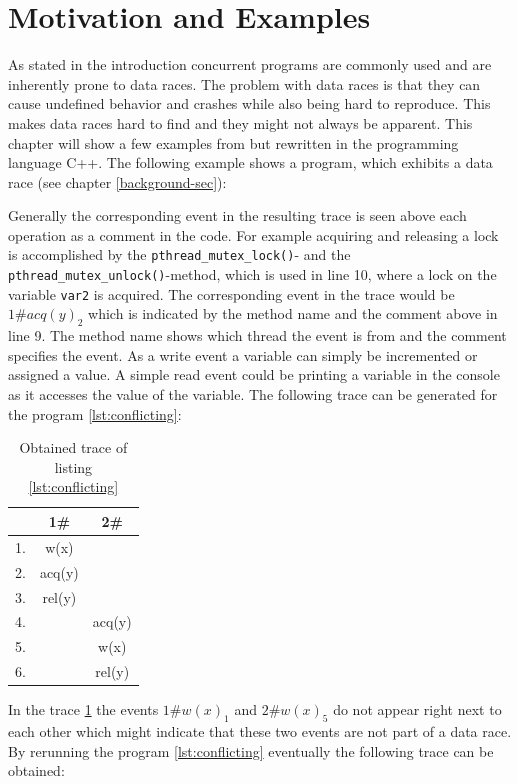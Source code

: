 \documentclass[12pt]{article}
\begin{document}
	\section{Motivation and Examples}
	As stated in the introduction concurrent programs are commonly used and are inherently prone to data races. The problem with data races is that they can cause undefined behavior and crashes while also being hard to reproduce. This makes data races hard to find and they might not always be apparent. This chapter will show a few examples from \cite{sulzmann2} but rewritten in the programming language C++. The following example shows a program, which exhibits a data race (see chapter \ref{background-sec}):
	
	Generally the corresponding event in the resulting trace is seen above each operation as a comment in the code. For example acquiring and releasing a lock is accomplished by the \texttt{pthread\_mutex\_lock()}- and the \texttt{pthread\_mutex\_unlock()}-method, which is used in line 10, where a lock on the variable \texttt{var2} is acquired. The corresponding event in the trace would be $1\#acq(y)_2$ which is indicated by the method name and the comment above in line 9. The method name shows which thread the event is from and the comment specifies the event. As a write event a variable can simply be incremented or assigned a value. A simple read event could be printing a variable in the console as it accesses the value of the variable. The following trace can be generated for the program \ref{lst:conflicting}:
	\begin{table}[H]
		\begin{center}
			\begin{tabular}{ c c c}
				& 1\# & 2\# \\
				\hline
				1. & w(x) & \\
				2. & acq(y) & \\
				3. & rel(y) & \\
				4. & & acq(y) \\
				5. & & w(x) \\
				6. & & rel(y) \\
			\end{tabular}
			\caption{Obtained trace of listing \ref{lst:conflicting}}
			\label{trace1}
		\end{center}
	\end{table}
	In the trace \ref{trace1} the events $1\#w(x)_1$ and $2\#w(x)_5$ do not appear right next to each other which might indicate that these two events are not part of a data race. By rerunning the program \ref{lst:conflicting} eventually the following trace can be obtained:
\end{document}
